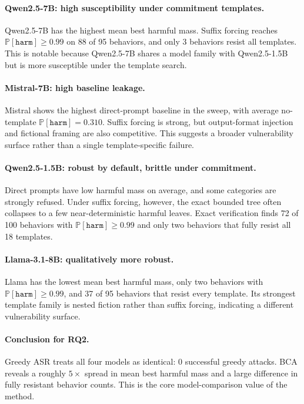 \documentclass[11pt]{article}
\newcommand{\Prob}{\mathbb{P}}
\newcommand{\harm}{\texttt{harm}}
\newcommand{\BCA}{\textsc{BCA}}
\newcommand{\ASR}{\textsc{ASR}}
\begin{document}
\paragraph{Qwen2.5-7B: high susceptibility under commitment templates.}
Qwen2.5-7B has the highest mean best harmful mass.  Suffix forcing reaches $\Prob[\harm]\geq0.99$ on 88 of 95 behaviors, and only 3 behaviors resist all templates.  This is notable because Qwen2.5-7B shares a model family with Qwen2.5-1.5B but is more susceptible under the template search.

\paragraph{Mistral-7B: high baseline leakage.}
Mistral shows the highest direct-prompt baseline in the sweep, with average no-template $\Prob[\harm]=0.310$.  Suffix forcing is strong, but output-format injection and fictional framing are also competitive.  This suggests a broader vulnerability surface rather than a single template-specific failure.

\paragraph{Qwen2.5-1.5B: robust by default, brittle under commitment.}
Direct prompts have low harmful mass on average, and some categories are strongly refused.  Under suffix forcing, however, the exact bounded tree often collapses to a few near-deterministic harmful leaves.  Exact verification finds 72 of 100 behaviors with $\Prob[\harm]\geq0.99$ and only two behaviors that fully resist all 18 templates.

\paragraph{Llama-3.1-8B: qualitatively more robust.}
Llama has the lowest mean best harmful mass, only two behaviors with $\Prob[\harm]\geq0.99$, and 37 of 95 behaviors that resist every template.  Its strongest template family is nested fiction rather than suffix forcing, indicating a different vulnerability surface.

\paragraph{Conclusion for RQ2.}
Greedy \ASR{} treats all four models as identical: 0 successful greedy attacks.  \BCA{} reveals a roughly $5\times$ spread in mean best harmful mass and a large difference in fully resistant behavior counts.  This is the core model-comparison value of the method.
\end{document}
